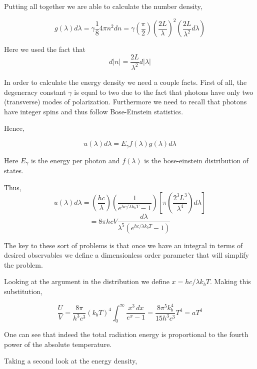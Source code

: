 \documentclass[10pt,twoside,openright]{memoir}
\begin{document}
Putting all together we are able to calculate the number density, 

\begin{equation}
g( \lambda ) d \lambda = \gamma \frac{1}{8} 4 \pi n^2 dn = \gamma \left( \frac{\pi}{2} \right) \left( \frac{2L}{\lambda} \right)^2 \left( \frac{2L}{\lambda ^2} d \lambda \right) 
\end{equation}

Here we used the fact that 
\begin{equation}
d | n | = \frac{2L}{\lambda ^2}  d| \lambda |
\end{equation}

In order to calculate the energy density we need a couple facts. First of all, the degeneracy constant $\gamma $ is equal to two due to the fact that photons have only two (transverse) modes of polarization. Furthermore we need to recall that photons have integer spins and thus follow Bose-Einstein statistics.

Hence,

\begin{equation}
u(\lambda ) d \lambda = E_{\gamma} f(\lambda) g(\lambda) d \lambda
\end{equation}

Here $E_{\gamma}$ is the energy per photon and $f(\lambda)$ is the bose-einstein distribution of states. 

Thus,
$$
u(\lambda ) d \lambda = \left( \frac{hc}{\lambda} \right) \left( \frac{1}{e^{hc/\lambda k_{b} T}-1} \right) \left[\pi \left( \frac{2^3 L^3}{\lambda ^4}\right) d \lambda \right] 
$$
$$
= 8 \pi h c V \frac{d \lambda}{\lambda^5 (e^{hc/\lambda k_{b} T}-1)}
$$

The key to these sort of problems is that once we have an integral in terms of desired observables we define a dimensionless order parameter that will simplify the problem. 

Looking at the argument in the distribution we define $x = hc/ \lambda k_b T$. Making this substitution,

\begin{equation}
\frac{U}{V} = \frac{8 \pi }{h^3 c^3}(k_b T)^4 \int^{\infty}_{0} \frac{x^3 \, dx}{e^x - 1} = \frac{8 \pi^5 k_b^4 }{15 h^3 c^3} T^4 = aT^4
\end{equation}

One can see that indeed the total radiation energy is proportional to the fourth power of the absolute temperature.

Taking a second look at the energy density,
\end{document}
